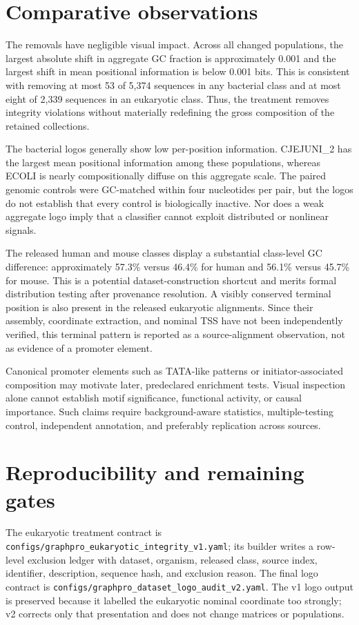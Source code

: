 \documentclass[11pt]{article}
\begin{document}
\section{Comparative observations}

The removals have negligible visual impact. Across all changed populations,
the largest absolute shift in aggregate GC fraction is approximately 0.001 and
the largest shift in mean positional information is below 0.001 bits. This is
consistent with removing at most 53 of 5,374 sequences in any bacterial class
and at most eight of 2,339 sequences in an eukaryotic class. Thus, the treatment
removes integrity violations without materially redefining the gross
composition of the retained collections.

The bacterial logos generally show low per-position information. CJEJUNI\_2
has the largest mean positional information among these populations, whereas
ECOLI is nearly compositionally diffuse on this aggregate scale. The paired
genomic controls were GC-matched within four nucleotides per pair, but the logos
do not establish that every control is biologically inactive. Nor does a weak
aggregate logo imply that a classifier cannot exploit distributed or
nonlinear signals.

The released human and mouse classes display a substantial class-level GC
difference: approximately 57.3\% versus 46.4\% for human and 56.1\% versus
45.7\% for mouse. This is a potential dataset-construction shortcut and merits
formal distribution testing after provenance resolution. A visibly conserved
terminal position is also present in the released eukaryotic alignments. Since
their assembly, coordinate extraction, and nominal TSS have not been
independently verified, this terminal pattern is reported as a source-alignment
observation, not as evidence of a promoter element.

Canonical promoter elements such as TATA-like patterns or initiator-associated
composition may motivate later, predeclared enrichment tests. Visual inspection
alone cannot establish motif significance, functional activity, or causal
importance. Such claims require background-aware statistics, multiple-testing
control, independent annotation, and preferably replication across sources.

\section{Reproducibility and remaining gates}

The eukaryotic treatment contract is
\texttt{configs/graphpro\_eukaryotic\_integrity\_v1.yaml}; its builder writes a
row-level exclusion ledger with dataset, organism, released class, source
index, identifier, description, sequence hash, and exclusion reason. The final
logo contract is
\texttt{configs/graphpro\_dataset\_logo\_audit\_v2.yaml}. The v1 logo output is
preserved because it labelled the eukaryotic nominal coordinate too strongly;
v2 corrects only that presentation and does not change matrices or populations.
\end{document}
